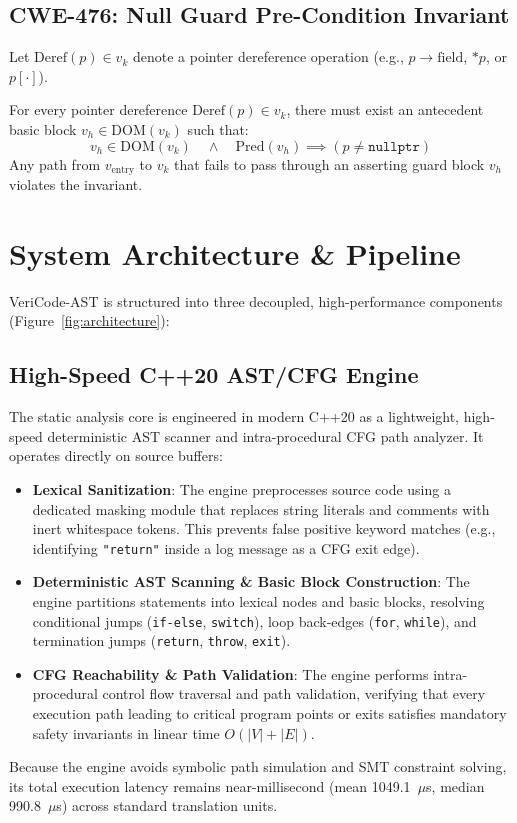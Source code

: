 \documentclass[sigconf,screen,nonacm,pbalance]{acmart}
\begin{document}
\subsection{CWE-476: Null Guard Pre-Condition Invariant}
Let $\text{Deref}(p) \in v_k$ denote a pointer dereference operation (e.g., $p\to\text{field}$, $*p$, or $p[\cdot]$).
\begin{definition}
For every pointer dereference $\text{Deref}(p) \in v_k$, there must exist an antecedent basic block $v_h \in \text{DOM}(v_k)$ such that:
\begin{equation}
    v_h \in \text{DOM}(v_k) \quad \land \quad \text{Pred}(v_h) \implies (p \neq \texttt{nullptr})
\end{equation}
Any path from $v_{\text{entry}}$ to $v_k$ that fails to pass through an asserting guard block $v_h$ violates the invariant.
\end{definition}

\section{System Architecture \& Pipeline}
\label{sec:architecture}

VeriCode-AST is structured into three decoupled, high-performance components (Figure~\ref{fig:architecture}):

\subsection{High-Speed C++20 AST/CFG Engine}
The static analysis core is engineered in modern C++20 as a lightweight, high-speed deterministic AST scanner and intra-procedural CFG path analyzer. It operates directly on source buffers:
\begin{itemize}
    \item \textbf{Lexical Sanitization}: The engine preprocesses source code using a dedicated masking module that replaces string literals and comments with inert whitespace tokens. This prevents false positive keyword matches (e.g., identifying \texttt{"return"} inside a log message as a CFG exit edge).
    \item \textbf{Deterministic AST Scanning \& Basic Block Construction}: The engine partitions statements into lexical nodes and basic blocks, resolving conditional jumps (\lstinline{if-else}, \lstinline{switch}), loop back-edges (\lstinline{for}, \lstinline{while}), and termination jumps (\lstinline{return}, \lstinline{throw}, \lstinline{exit}).
    \item \textbf{CFG Reachability \& Path Validation}: The engine performs intra-procedural control flow traversal and path validation, verifying that every execution path leading to critical program points or exits satisfies mandatory safety invariants in linear time $O(|V| + |E|)$.
\end{itemize}
Because the engine avoids symbolic path simulation and SMT constraint solving, its total execution latency remains near-millisecond (mean 1049.1~$\mu$s, median 990.8~$\mu$s) across standard translation units.
\end{document}
